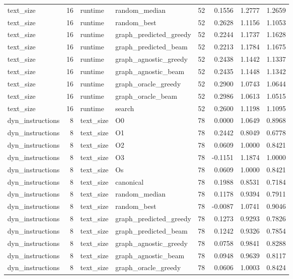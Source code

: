 \begin{table}[t]
\begin{tabular}{lrllrrrr}
text\_size & 16 & runtime & random\_median & 52 & 0.1556 & 1.2777 & 1.2659 \\
text\_size & 16 & runtime & random\_best & 52 & 0.2628 & 1.1156 & 1.1053 \\
text\_size & 16 & runtime & graph\_predicted\_greedy & 52 & 0.2244 & 1.1737 & 1.1628 \\
text\_size & 16 & runtime & graph\_predicted\_beam & 52 & 0.2213 & 1.1784 & 1.1675 \\
text\_size & 16 & runtime & graph\_agnostic\_greedy & 52 & 0.2438 & 1.1442 & 1.1337 \\
text\_size & 16 & runtime & graph\_agnostic\_beam & 52 & 0.2435 & 1.1448 & 1.1342 \\
text\_size & 16 & runtime & graph\_oracle\_greedy & 52 & 0.2900 & 1.0743 & 1.0644 \\
text\_size & 16 & runtime & graph\_oracle\_beam & 52 & 0.2986 & 1.0613 & 1.0515 \\
text\_size & 16 & runtime & search & 52 & 0.2600 & 1.1198 & 1.1095 \\
dyn\_instructions & 8 & text\_size & O0 & 78 & 0.0000 & 1.0649 & 0.8968 \\
dyn\_instructions & 8 & text\_size & O1 & 78 & 0.2442 & 0.8049 & 0.6778 \\
dyn\_instructions & 8 & text\_size & O2 & 78 & 0.0609 & 1.0000 & 0.8421 \\
dyn\_instructions & 8 & text\_size & O3 & 78 & -0.1151 & 1.1874 & 1.0000 \\
dyn\_instructions & 8 & text\_size & Os & 78 & 0.0609 & 1.0000 & 0.8421 \\
dyn\_instructions & 8 & text\_size & canonical & 78 & 0.1988 & 0.8531 & 0.7184 \\
dyn\_instructions & 8 & text\_size & random\_median & 78 & 0.1178 & 0.9394 & 0.7911 \\
dyn\_instructions & 8 & text\_size & random\_best & 78 & -0.0087 & 1.0741 & 0.9046 \\
dyn\_instructions & 8 & text\_size & graph\_predicted\_greedy & 78 & 0.1273 & 0.9293 & 0.7826 \\
dyn\_instructions & 8 & text\_size & graph\_predicted\_beam & 78 & 0.1242 & 0.9326 & 0.7854 \\
dyn\_instructions & 8 & text\_size & graph\_agnostic\_greedy & 78 & 0.0758 & 0.9841 & 0.8288 \\
dyn\_instructions & 8 & text\_size & graph\_agnostic\_beam & 78 & 0.0948 & 0.9639 & 0.8117 \\
dyn\_instructions & 8 & text\_size & graph\_oracle\_greedy & 78 & 0.0606 & 1.0003 & 0.8424 \\

\end{tabular}
\end{table}
